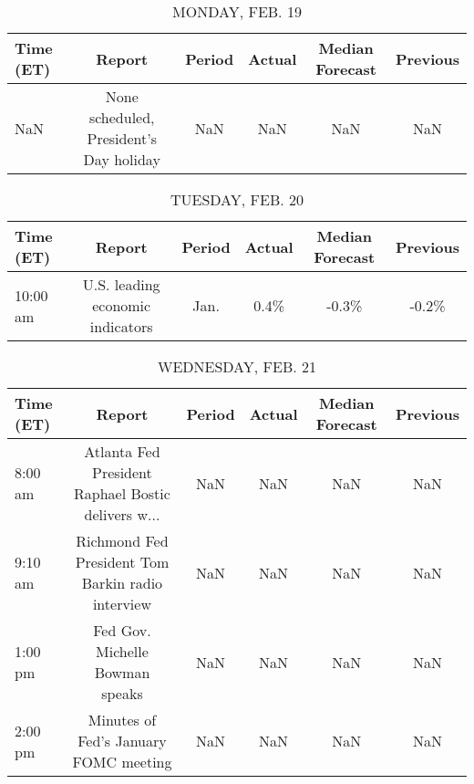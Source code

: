 \documentclass{article}%
\begin{document}
%
\normalsize%


\begin{table}[htbp]%
\caption{MONDAY, FEB. 19}%
\centering%
\begin{adjustbox}{width=1\textwidth}%
\begin{tabular}{lccccc}
\toprule
Time (ET) &                                  Report & Period & Actual & Median Forecast & Previous \\
\midrule
      NaN & None scheduled, President's Day holiday &    NaN &    NaN &             NaN &      NaN \\
\bottomrule
\end{tabular}
%
\end{adjustbox}%
\end{table}

%


\begin{table}[htbp]%
\caption{TUESDAY, FEB. 20}%
\centering%
\begin{adjustbox}{width=1\textwidth}%
\begin{tabular}{lccccc}
\toprule
Time (ET) &                           Report & Period & Actual & Median Forecast & Previous \\
\midrule
 10:00 am & U.S. leading economic indicators &   Jan. &   0.4\% &           -0.3\% &    -0.2\% \\
\bottomrule
\end{tabular}
%
\end{adjustbox}%
\end{table}

%


\begin{table}[htbp]%
\caption{WEDNESDAY, FEB. 21}%
\centering%
\begin{adjustbox}{width=1\textwidth}%
\begin{tabular}{lccccc}
\toprule
Time (ET) &                                             Report & Period & Actual & Median Forecast & Previous \\
\midrule
  8:00 am & Atlanta Fed President Raphael Bostic delivers w... &    NaN &    NaN &             NaN &      NaN \\
  9:10 am &  Richmond Fed President Tom Barkin radio interview &    NaN &    NaN &             NaN &      NaN \\
  1:00 pm &                    Fed Gov. Michelle Bowman speaks &    NaN &    NaN &             NaN &      NaN \\
  2:00 pm &              Minutes of Fed's January FOMC meeting &    NaN &    NaN &             NaN &      NaN \\
\bottomrule
\end{tabular}
%
\end{adjustbox}%
\end{table}
\end{document}
